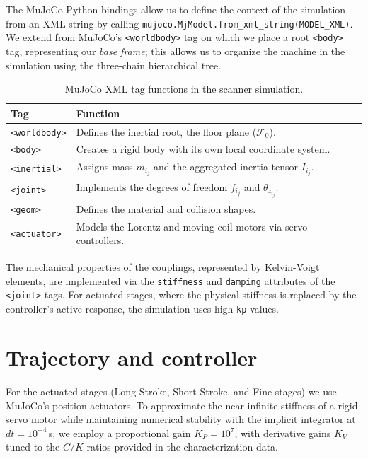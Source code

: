 \documentclass[11pt,letterpaper]{article}
\begin{document}
The MuJoCo Python bindings allow us to define the context of the simulation from an XML string by calling \texttt{mujoco.MjModel.from\_xml\_string(MODEL\_XML)}. We extend from MuJoCo's \texttt{<worldbody>} tag on which we place a root \texttt{<body>} tag, representing our \textit{base frame}; this allows us to organize the machine in the simulation using the three-chain hierarchical tree.

\begin{table}[h]
\centering
\caption{MuJoCo XML tag functions in the scanner simulation.}
\begin{tabular}{ll}
\toprule
Tag & Function \\
\midrule
\texttt{<worldbody>} & Defines the inertial root, the floor plane ($\mathcal{F}_0$). \\
\texttt{<body>}      & Creates a rigid body with its own local coordinate system. \\
\texttt{<inertial>}  & Assigns mass $m_{i_j}$ and the aggregated inertia tensor $I_{i_j}$. \\
\texttt{<joint>}     & Implements the degrees of freedom $f_{i_j}$ and $\theta_{z_{i_j}}$. \\
\texttt{<geom>}      & Defines the material and collision shapes. \\
\texttt{<actuator>}  & Models the Lorentz and moving-coil motors via servo controllers. \\
\bottomrule
\end{tabular}
\end{table}

The mechanical properties of the couplings, represented by Kelvin-Voigt elements, are implemented via the \texttt{stiffness} and \texttt{damping} attributes of the \texttt{<joint>} tags. For actuated stages, where the physical stiffness is replaced by the controller's active response, the simulation uses high \texttt{kp} values.

\section*{Trajectory and controller}

For the actuated stages (Long-Stroke, Short-Stroke, and Fine stages) we use MuJoCo's position actuators. To approximate the near-infinite stiffness of a rigid servo motor while maintaining numerical stability with the implicit integrator at $dt = 10^{-4}$\,s, we employ a proportional gain $K_P = 10^7$, with derivative gains $K_V$ tuned to the $C/K$ ratios provided in the characterization data.
\end{document}
